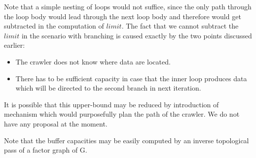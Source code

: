 
Note that a simple nesting of loops would not suffice, since the only path through the loop body would lead through the next loop body and therefore would get subtracted in the computation of $limit$. The fact that we cannot subtract the $limit$ in the scenario with branching is caused exactly by the two points discussed earlier:
\begin{itemize}
  \item The crawler does not know where data are located.
  \item There has to be sufficient capacity in case that the inner loop produces data which will be directed to the second branch in next iteration. 
\end{itemize}

It is possible that this upper-bound may be reduced by introduction of mechanism which would purposefully plan the path of the crawler. We do not have any proposal at the moment.
  


\begin{rem}
  Note that the buffer capacities may be easily computed by an inverse topological pass of a factor graph of G. 
\end{rem}


